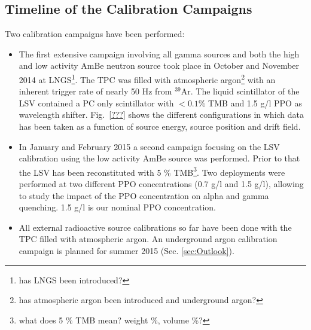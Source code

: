 

\subsection{Timeline of the Calibration Campaigns}
Two calibration campaigns have been performed:
\begin{itemize}
\item The first extensive campaign involving all gamma sources and both the high and low activity AmBe neutron source took place in October and November 2014 at LNGS\footnote{has LNGS been introduced?}. The TPC was filled with atmospheric argon\footnote{has atmospheric argon been introduced and underground argon?} with an inherent trigger rate of nearly 50 Hz from $^{39}$Ar. The liquid scintillator of the LSV contained a PC only scintillator with $<0.1 \%$ TMB and 1.5 g/l PPO as wavelength shifter.
Fig.~\ref{???} shows the different configurations in which data has been taken as a function of source energy, source position and drift field.

\item In January and February 2015 a second campaign focusing on the LSV calibration using the low activity AmBe source was performed. Prior to that the LSV has been reconstituted with 5 \% TMB\footnote{what does 5 \% TMB mean? weight \%, volume \%?}. Two deployments were performed at two different PPO concentrations (0.7 g/l and 1.5 g/l), allowing to study the impact of the PPO concentration on alpha and gamma quenching. 1.5 g/l is our nominal PPO concentration.



\item All external radioactive source calibrations so far have been done with the TPC filled with atmospheric argon. An underground argon calibration campaign is planned for summer 2015 (Sec. \ref{sec:Outlook}).

\end{itemize}